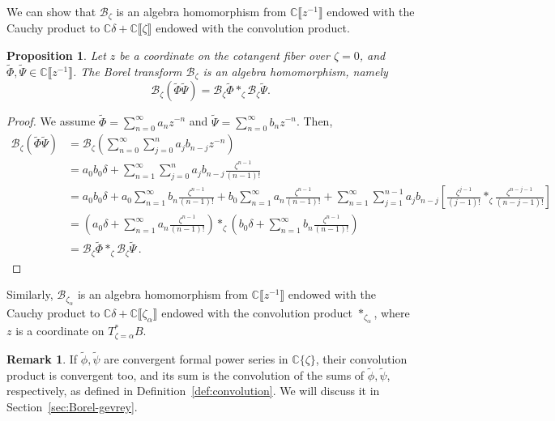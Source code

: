 \documentclass{article}
\newcommand{\C}{\mathbb{C}}
\newcommand{\series}[1]{\tilde{#1}}
\newcommand{\borel}{\mathcal{B}}
\theoremstyle{definition}
\newtheorem{remark}[definition]{Remark}
\theoremstyle{plain}
\newtheorem{prop}[definition]{Proposition}
\begin{document}
We can show that $\borel_\zeta$ is an algebra homomorphism from $\C\llbracket z^{-1}\rrbracket$ endowed with the Cauchy product to $\C\delta+\C\llbracket\zeta\rrbracket$ endowed with the convolution product.
\begin{prop}
Let $z$ be a coordinate on the cotangent fiber over $\zeta=0$, and $\series{\Phi},\series{\Psi}\in\C\llbracket z^{-1}\rrbracket$. The Borel transform $\borel_\zeta$ is an algebra homomorphism, namely
\[\borel_\zeta(\series{\Phi}\series{\Psi})=\borel_\zeta\series{\Phi} \ast_\zeta \borel_\zeta\series{\Psi}.\]
\end{prop}
\begin{proof}
    We assume $\series{\Phi}=\sum_{n=0}^\infty a_nz^{-n}$ and $\series{\Psi}=\sum_{n=0}^\infty b_nz^{-n}$. Then,
    \begin{align*}
\borel_\zeta(\series{\Phi}\series{\Psi})&=\borel_\zeta\left(\sum_{n=0}^\infty\sum_{j=0}^na_jb_{n-j}z^{-n}\right)\\
&=a_0b_0\delta +\sum_{n=1}^\infty\sum_{j=0}^na_jb_{n-j}\frac{\zeta^{n-1}}{(n-1)!}\\
&=a_0b_0\delta+a_0\sum_{n=1}^\infty b_{n}\frac{\zeta^{n-1}}{(n-1)!}+b_0\sum_{n=1}^\infty a_n\frac{\zeta^{n-1}}{(n-1)!}+\sum_{n=1}^\infty\sum_{j=1}^{n-1}a_jb_{n-j}\left[\frac{\zeta^{j-1}}{(j-1)!} \ast_\zeta \frac{\zeta^{n-j-1}}{(n-j-1)!}\right]\\
&=\left(a_0\delta+\sum_{n=1}^\infty a_n\frac{\zeta^{n-1}}{(n-1)!}\right)\ast_\zeta\left(b_0\delta+\sum_{n=1}^\infty b_n\frac{\zeta^{n-1}}{(n-1)!}\right)\\
&=\borel_\zeta\series{\Phi} \ast_\zeta \borel_\zeta\series{\Psi}\,.
\end{align*}
\end{proof}
Similarly, $\borel_{\zeta_\alpha}$ is an algebra homomorphism from $\C\llbracket z^{-1}\rrbracket$ endowed with the Cauchy product to $\C\delta+\C\llbracket\zeta_\alpha\rrbracket$ endowed with the convolution product $\ast_{\zeta_\alpha}$, where $z$ is a coordinate on $T^*_{\zeta=\alpha}B$. %
\begin{remark}
If $\series{\phi}, \series{\psi}$ are convergent formal power series in $\C\{\zeta\}$, their convolution product is convergent too, and its sum is the convolution of the sums of $\series{\phi}, \series{\psi}$, respectively, as defined in Definition~\ref{def:convolution}. We will discuss it in Section~\ref{sec:Borel-gevrey}.
\end{remark}
%
\end{document}
